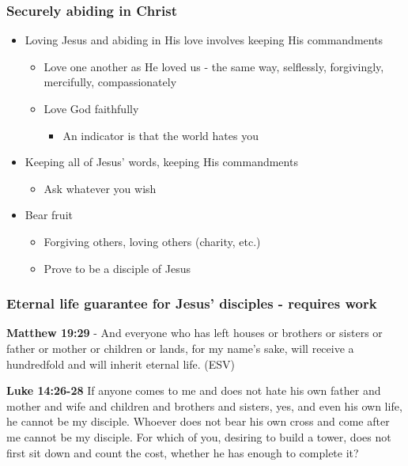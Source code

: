 \documentclass[11pt]{article}
\begin{document}
\subsubsection{Securely abiding in Christ}
\label{sec:org4ca316a}
\begin{itemize}
\item Loving Jesus and abiding in His love involves keeping His commandments
\begin{itemize}
\item Love one another as He loved us - the same way, selflessly, forgivingly, mercifully, compassionately
\item Love God faithfully
\begin{itemize}
\item An indicator is that the world hates you
\end{itemize}
\end{itemize}
\item Keeping all of Jesus' words, keeping His commandments
\begin{itemize}
\item Ask whatever you wish
\end{itemize}
\item Bear fruit
\begin{itemize}
\item Forgiving others, loving others (charity, etc.)
\item Prove to be a disciple of Jesus
\end{itemize}
\end{itemize}

\subsubsection{Eternal life guarantee for Jesus' disciples - requires work}
\label{sec:orga86a4c0}

\textbf{Matthew 19:29} - And everyone who has left houses or brothers or sisters or father or mother or children or lands, for my name's sake, will receive a hundredfold and will inherit eternal life. (ESV)

\textbf{Luke 14:26-28} If anyone comes to me and does not hate his own father and mother and wife and children and brothers and sisters, yes, and even his own life, he cannot be my disciple. Whoever does not bear his own cross and come after me cannot be my disciple. For which of you, desiring to build a tower, does not first sit down and count the cost, whether he has enough to complete it?
\end{document}
